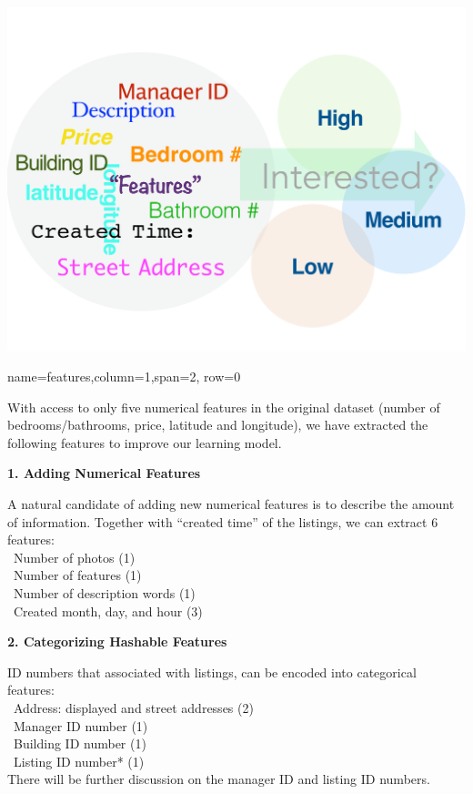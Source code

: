\documentclass[landscape,final,a0paper,fontscale=0.285]{baposter}
\begin{document}
\begin{poster}
{  {\centering\includegraphics[width=0.9\linewidth]{images/overview.pdf}\\}
  
}

  {name=features,column=1,span=2, row=0}{
  \begin{multicols}{2}
  With access to only five numerical features in the original dataset (number of bedrooms/bathrooms, price, latitude and longitude), we have extracted the following features to improve our learning model.
  \vspace{0.5em}
  
  \noindent\textbf{1. Adding Numerical Features}\vspace{0.2em}
  
  A natural candidate of adding new numerical features is to describe the amount of information. Together with ``created time'' of the listings, we can extract 6 features:\\
  \indent\textbullet ~Number of photos (1)\\
  \indent\textbullet ~Number of features (1)\\
  \indent\textbullet ~Number of description words (1)\\
  \indent\textbullet ~Created month, day, and hour (3)
  \vspace{0.5em}
 
  \noindent\textbf{2. Categorizing Hashable Features}\vspace{0.2em}

  ID numbers that associated with listings, can be encoded into categorical features: \\
  \indent\textbullet ~Address: displayed and street addresses (2)\\
  \indent\textbullet ~Manager ID number (1)\\
  \indent\textbullet ~Building ID number (1)\\
  \indent\textbullet ~Listing ID number* (1)\\
  There will be further discussion on the manager ID and listing ID numbers.
  \vspace{0.5em}
  

\end{multicols}}
\end{poster}
\end{document}
